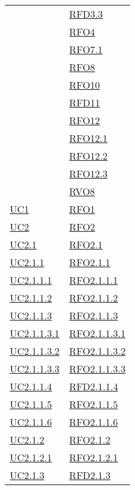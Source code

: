 \begin{longtable}{|>{\centering}m{5cm}|m{5cm}<{\centering}|}
& \hyperlink{RFD3.3}{RFD3.3}\\
& \hyperlink{RFO4}{RFO4}\\
& \hyperlink{RFO7.1}{RFO7.1}\\
& \hyperlink{RFO8}{RFO8}\\
& \hyperlink{RFO10}{RFO10}\\
& \hyperlink{RFD11}{RFD11}\\
& \hyperlink{RFO12}{RFO12}\\
& \hyperlink{RFO12.1}{RFO12.1}\\
& \hyperlink{RFO12.2}{RFO12.2}\\
& \hyperlink{RFO12.3}{RFO12.3}\\
& \hyperlink{RVO8}{RVO8}\\ \hline
\hyperref[UC1]{UC1} & \hyperlink{RFO1}{RFO1}\\ \hline
\hyperref[UC2]{UC2} & \hyperlink{RFO2}{RFO2}\\ \hline
\hyperref[UC2.1]{UC2.1} & \hyperlink{RFO2.1}{RFO2.1}\\ \hline
\hyperref[UC2.1.1]{UC2.1.1} & \hyperlink{RFO2.1.1}{RFO2.1.1}\\ \hline
\hyperref[UC2.1.1.1]{UC2.1.1.1} & \hyperlink{RFO2.1.1.1}{RFO2.1.1.1}\\ \hline
\hyperref[UC2.1.1.2]{UC2.1.1.2} & \hyperlink{RFO2.1.1.2}{RFO2.1.1.2}\\ \hline
\hyperref[UC2.1.1.3]{UC2.1.1.3} & \hyperlink{RFO2.1.1.3}{RFO2.1.1.3}\\ \hline
\hyperref[UC2.1.1.3.1]{UC2.1.1.3.1} & \hyperlink{RFO2.1.1.3.1}{RFO2.1.1.3.1}\\ \hline
\hyperref[UC2.1.1.3.2]{UC2.1.1.3.2} & \hyperlink{RFO2.1.1.3.2}{RFO2.1.1.3.2}\\ \hline
\hyperref[UC2.1.1.3.3]{UC2.1.1.3.3} & \hyperlink{RFO2.1.1.3.3}{RFO2.1.1.3.3}\\ \hline
\hyperref[UC2.1.1.4]{UC2.1.1.4} & \hyperlink{RFD2.1.1.4}{RFD2.1.1.4}\\ \hline
\hyperref[UC2.1.1.5]{UC2.1.1.5} & \hyperlink{RFO2.1.1.5}{RFO2.1.1.5}\\ \hline
\hyperref[UC2.1.1.6]{UC2.1.1.6} & \hyperlink{RFO2.1.1.6}{RFO2.1.1.6}\\ \hline
\hyperref[UC2.1.2]{UC2.1.2} & \hyperlink{RFO2.1.2}{RFO2.1.2}\\ \hline
\hyperref[UC2.1.2.1]{UC2.1.2.1} & \hyperlink{RFO2.1.2.1}{RFO2.1.2.1}\\ \hline
\hyperref[UC2.1.3]{UC2.1.3} & \hyperlink{RFD2.1.3}{RFD2.1.3}\\ \hline

\end{longtable}
